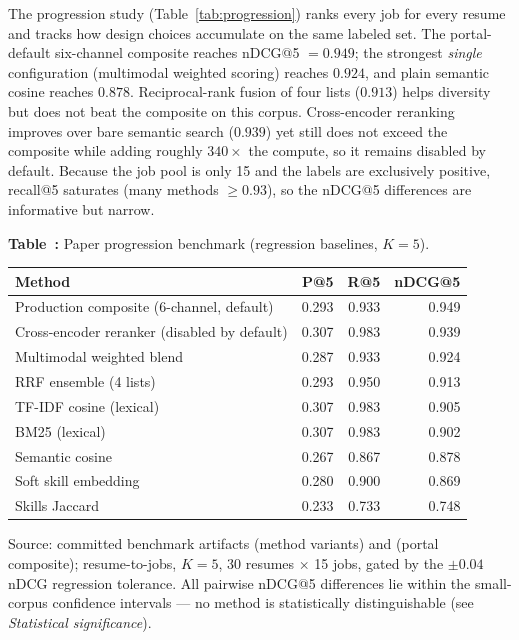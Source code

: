 The progression study (Table~\ref{tab:progression}) ranks every job for every resume and tracks how design choices accumulate on the same labeled set.
The portal-default six-channel composite reaches nDCG@5 $= 0.949$; the strongest \emph{single} configuration (multimodal weighted scoring) reaches $0.924$, and plain semantic cosine reaches $0.878$.
Reciprocal-rank fusion of four lists ($0.913$) helps diversity but does not beat the composite on this corpus.
Cross-encoder reranking improves over bare semantic search ($0.939$) yet still does not exceed the composite while adding roughly $340\times$ the compute, so it remains disabled by default.
Because the job pool is only 15 and the labels are exclusively positive, recall@5 saturates (many methods $\geq 0.93$), so the nDCG@5 differences are informative but narrow.

\begin{center}
\label{tab:progression}
\par\smallskip\noindent\textbf{Table~\thetable:} Paper progression benchmark (regression baselines, $K{=}5$).
\par\smallskip
\begin{tabular}{@{}lrrr@{}}
\toprule
Method & P@5 & R@5 & nDCG@5 \\
\midrule
Production composite (6-channel, default) & 0.293 & 0.933 & 0.949 \\
Cross-encoder reranker (disabled by default) & 0.307 & 0.983 & 0.939 \\
Multimodal weighted blend & 0.287 & 0.933 & 0.924 \\
RRF ensemble (4 lists) & 0.293 & 0.950 & 0.913 \\
TF-IDF cosine (lexical) & 0.307 & 0.983 & 0.905 \\
BM25 (lexical) & 0.307 & 0.983 & 0.902 \\
Semantic cosine & 0.267 & 0.867 & 0.878 \\
Soft skill embedding & 0.280 & 0.900 & 0.869 \\
Skills Jaccard & 0.233 & 0.733 & 0.748 \\
\bottomrule
\end{tabular}
\par\vspace{0.4em}
\footnotesize{Source: committed benchmark artifacts  (method variants) and  (portal composite); resume-to-jobs, $K{=}5$, 30 resumes $\times$ 15 jobs, gated by the $\pm 0.04$ nDCG regression tolerance. All pairwise nDCG@5 differences lie within the small-corpus confidence intervals --- no method is statistically distinguishable (see \emph{Statistical significance}).}
\end{center}

